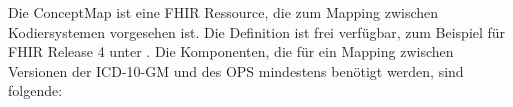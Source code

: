 \vspace{-0.4em}

\label{conceptmap-structure}

Die ConceptMap ist eine FHIR Ressource, die zum Mapping zwischen Kodiersystemen vorgesehen ist. Die Definition ist frei verfügbar, zum Beispiel für FHIR Release 4 unter \cite[FHIR R4]{conceptmap-r4}. Die Komponenten, die für ein Mapping zwischen Versionen der ICD-10-GM und des OPS mindestens benötigt werden, sind folgende:

\begin{comment}
\begin{customIndentRight2}
\setlength{\tabcolsep}{12pt}
\begin{tabular}{ccccc}
ConceptMap & & & & \\
\drawHookArrow & url & & & \\
\drawHookArrow & id & & & \\
\drawHookArrow & group & & & \\
               & \drawHookArrow & source & & \\
               & \drawHookArrow & target & & \\
               & \drawHookArrow & element & & \\
               &                & \drawHookArrow & code & \\
               &                & \drawHookArrow & target & \\
               &                &                & \drawHookArrow & code \\
               &                &                & \drawHookArrow & equivalence \\
\end{tabular}
\end{customIndentRight2}
\end{comment}

